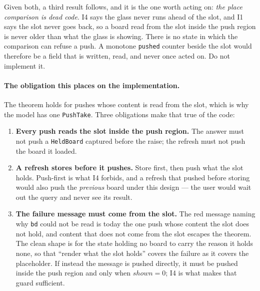 \documentclass[a4paper,10pt,fleqn]{article}
\begin{document}
Given both, a third result follows, and it is the one worth acting on: \emph{the
place comparison is dead code}. I4 says the glass never runs ahead of the slot,
and I1 says the slot never goes back, so a board read from the slot inside the
push region is never older than what the glass is showing. There is no state in
which the comparison can refuse a push. A monotone \texttt{pushed} counter
beside the slot would therefore be a field that is written, read, and never once
acted on. Do not implement it.

\paragraph{The obligation this places on the implementation.}
The theorem holds for pushes whose content is read from the slot, which is why
the model has one \texttt{PushTake}. Three obligations make that true of the
code:

\begin{enumerate}
  \item \textbf{Every push reads the slot inside the push region.} The answer
    must not push a \texttt{HeldBoard} captured before the raise; the refresh
    must not push the board it loaded.
  \item \textbf{A refresh stores before it pushes.} Store first, then push what
    the slot holds. Push-first is what I4 forbids, and a refresh that pushed
    before storing would also push the \emph{previous} board under this design
    --- the user would wait out the query and never see its result.
  \item \textbf{The failure message must come from the slot.} The red message
    naming why \texttt{bd} could not be read is today the one push whose content
    the slot does not hold, and content that does not come from the slot escapes
    the theorem. The clean shape is for the state holding no board to carry the
    reason it holds none, so that ``render what the slot holds'' covers the
    failure as it covers the placeholder. If instead the message is pushed
    directly, it must be pushed inside the push region and only when
    $shown = 0$; I4 is what makes that guard sufficient.
\end{enumerate}
\end{document}
